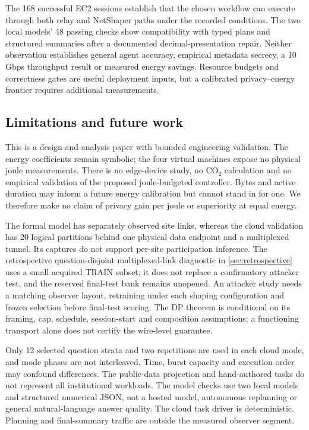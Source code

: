 The 168 successful EC2 sessions establish that the chosen workflow can execute through both relay and NetShaper paths under the recorded conditions. The two local models' 48 passing checks show compatibility with typed plans and structured summaries after a documented decimal-presentation repair. Neither observation establishes general agent accuracy, empirical metadata secrecy, a 10\,Gbps throughput result or measured energy savings. Resource budgets and correctness gates are useful deployment inputs, but a calibrated privacy--energy frontier requires additional measurements.

\subsection{Limitations and future work}
This is a design-and-analysis paper with bounded engineering validation. The energy coefficients remain symbolic; the four virtual machines expose no physical joule measurements. There is no edge-device study, no CO$_2$ calculation and no empirical validation of the proposed joule-budgeted controller. Bytes and active duration may inform a future energy calibration but cannot stand in for one. We therefore make no claim of privacy gain per joule or superiority at equal energy.

The formal model has separately observed site links, whereas the cloud validation has 20 logical partitions behind one physical data endpoint and a multiplexed tunnel. Its captures do not support per-site participation inference. The retrospective question-disjoint multiplexed-link diagnostic in \cref{sec:retrospective} uses a small acquired TRAIN subset; it does not replace a confirmatory attacker test, and the reserved final-test bank remains unopened. An attacker study needs a matching observer layout, retraining under each shaping configuration and frozen selection before final-test scoring. The DP theorem is conditional on its framing, cap, schedule, session-start and composition assumptions; a functioning transport alone does not certify the wire-level guarantee.

Only 12 selected question strata and two repetitions are used in each cloud mode, and mode phases are not interleaved. Time, burst capacity and execution order may confound differences. The public-data projection and hand-authored tasks do not represent all institutional workloads. The model checks use two local models and structured numerical JSON, not a hosted model, autonomous replanning or general natural-language answer quality. The cloud task driver is deterministic. Planning and final-summary traffic are outside the measured observer segment.

